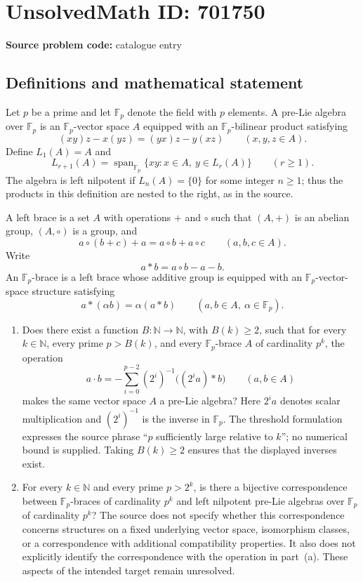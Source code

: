 \documentclass[11pt]{article}
\newcommand{\N}{\mathbb{N}}
\newcommand{\F}{\mathbb{F}}
\begin{document}
\section*{UnsolvedMath ID: 701750}
\textbf{Source problem code:} catalogue entry
\subsection{Definitions and mathematical statement}
Let \(p\) be a prime and let \(\F_p\) denote the field with \(p\) elements. A pre-Lie algebra over \(\F_p\) is an \(\F_p\)-vector space \(A\) equipped with an \(\F_p\)-bilinear product satisfying
\[
(xy)z-x(yz)=(yx)z-y(xz)\qquad(x,y,z\in A).
\]
Define \(L_1(A)=A\) and
\[
L_{r+1}(A)=\operatorname{span}_{\F_p}\{xy:x\in A,\ y\in L_r(A)\}\qquad(r\geq 1).
\]
The algebra is left nilpotent if \(L_n(A)=\{0\}\) for some integer \(n\geq 1\); thus the products in this definition are nested to the right, as in the source.

A left brace is a set \(A\) with operations \(+\) and \(\circ\) such that \((A,+)\) is an abelian group, \((A,\circ)\) is a group, and
\[
a\circ(b+c)+a=a\circ b+a\circ c\qquad(a,b,c\in A).
\]
Write
\[
a*b=a\circ b-a-b.
\]
An \(\F_p\)-brace is a left brace whose additive group is equipped with an \(\F_p\)-vector-space structure satisfying
\[
a*(\alpha b)=\alpha(a*b)\qquad(a,b\in A,\ \alpha\in\F_p).
\]

\begin{enumerate}
\item[(a)] Does there exist a function \(B:\N\to\N\), with \(B(k)\geq 2\), such that for every \(k\in\N\), every prime \(p>B(k)\), and every \(\F_p\)-brace \(A\) of cardinality \(p^k\), the operation
\[
a\cdot b=-\sum_{i=0}^{p-2}(2^i)^{-1}\bigl((2^i a)*b\bigr)\qquad(a,b\in A)
\]
makes the same vector space \(A\) a pre-Lie algebra? Here \(2^i a\) denotes scalar multiplication and \((2^i)^{-1}\) is the inverse in \(\F_p\). The threshold formulation expresses the source phrase ``\(p\) sufficiently large relative to \(k\)''; no numerical bound is supplied. Taking \(B(k)\geq 2\) ensures that the displayed inverses exist.
\item[(b)] For every \(k\in\N\) and every prime \(p>2^k\), is there a bijective correspondence between \(\F_p\)-braces of cardinality \(p^k\) and left nilpotent pre-Lie algebras over \(\F_p\) of cardinality \(p^k\)? The source does not specify whether this correspondence concerns structures on a fixed underlying vector space, isomorphism classes, or a correspondence with additional compatibility properties. It also does not explicitly identify the correspondence with the operation in part~(a). These aspects of the intended target remain unresolved.
\end{enumerate}
\end{document}
